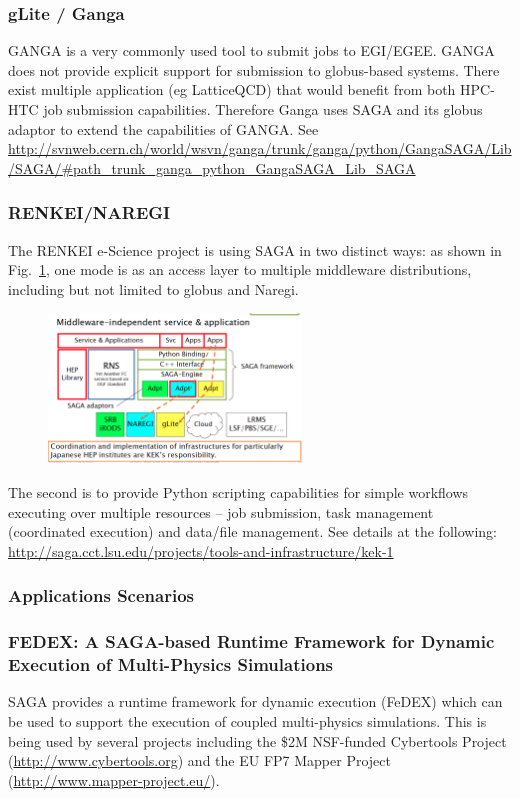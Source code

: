 \documentclass[12pt]{article}
\begin{document}
\subsubsection*{gLite / Ganga} 

GANGA is a very commonly used tool to submit jobs to EGI/EGEE. GANGA
does not provide explicit support for submission to globus-based
systems. There exist multiple application (eg LatticeQCD) that would
benefit from both HPC-HTC job submission capabilities. Therefore Ganga
uses SAGA and its globus adaptor to extend the capabilities of GANGA.
See
\url{http://svnweb.cern.ch/world/wsvn/ganga/trunk/ganga/python/GangaSAGA/Lib/SAGA/#path_trunk_ganga_python_GangaSAGA_Lib_SAGA}

\subsubsection*{RENKEI/NAREGI}

The RENKEI e-Science project is using SAGA in two distinct ways: as
shown in Fig.~\ref{fig:renkei}, one mode is as an access layer to
multiple middleware distributions, including but not limited to globus
and Naregi.
\begin{figure}[t]
      \centering
      \includegraphics[width=0.6\textwidth]{saga-renkei.png}
      \caption{\footnotesize }
      \label{fig:renkei}
\end{figure}
The second is to provide Python scripting capabilities for simple
workflows executing over multiple resources -- job submission, task
management (coordinated execution) and data/file management.  See
details at the following:
\url{http://saga.cct.lsu.edu/projects/tools-and-infrastructure/kek-1}





\subsubsection{Applications Scenarios}

\subsubsection*{FEDEX: A SAGA-based Runtime Framework for Dynamic
  Execution of Multi-Physics Simulations}
SAGA provides a runtime framework for dynamic execution (FeDEX) which
can be used to support the execution of coupled multi-physics
simulations. This is being used by several projects including the \$2M
NSF-funded Cybertools Project (\url{http://www.cybertools.org}) and
the EU FP7 Mapper Project (\url{http://www.mapper-project.eu/}).
\end{document}
